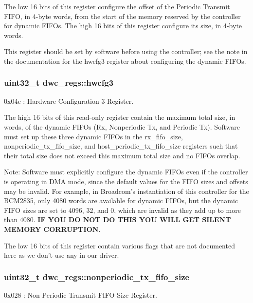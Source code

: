 The low 16 bits of this register configure the offset of the Periodic Transmit F\-I\-F\-O, in 4-\/byte words, from the start of the memory reserved by the controller for dynamic F\-I\-F\-Os. The high 16 bits of this register configure its size, in 4-\/byte words.

This register should be set by software before using the controller; see the note in the documentation for the hwcfg3 register about configuring the dynamic F\-I\-F\-Os. \hypertarget{structdwc__regs_a8c12bd03fc0263cffee12c1467519b7d}{
\subsubsection[{hwcfg3}]{\setlength{\rightskip}{0pt plus 5cm}uint32\-\_\-t dwc\-\_\-regs\-::hwcfg3}}\label{structdwc__regs_a8c12bd03fc0263cffee12c1467519b7d}
0x04c \-: Hardware Configuration 3 Register.

The high 16 bits of this read-\/only register contain the maximum total size, in words, of the dynamic F\-I\-F\-Os (Rx, Nonperiodic Tx, and Periodic Tx). Software must set up these three dynamic F\-I\-F\-Os in the rx\-\_\-fifo\-\_\-size, nonperiodic\-\_\-tx\-\_\-fifo\-\_\-size, and host\-\_\-periodic\-\_\-tx\-\_\-fifo\-\_\-size registers such that their total size does not exceed this maximum total size and no F\-I\-F\-Os overlap.

Note\-: Software must explicitly configure the dynamic F\-I\-F\-Os even if the controller is operating in D\-M\-A mode, since the default values for the F\-I\-F\-O sizes and offsets may be invalid. For example, in Broadcom's instantiation of this controller for the B\-C\-M2835, only 4080 words are available for dynamic F\-I\-F\-Os, but the dynamic F\-I\-F\-O sizes are set to 4096, 32, and 0, which are invalid as they add up to more than 4080. {\bfseries I\-F Y\-O\-U D\-O N\-O\-T D\-O T\-H\-I\-S Y\-O\-U W\-I\-L\-L G\-E\-T S\-I\-L\-E\-N\-T M\-E\-M\-O\-R\-Y C\-O\-R\-R\-U\-P\-T\-I\-O\-N}.

The low 16 bits of this register contain various flags that are not documented here as we don't use any in our driver. \hypertarget{structdwc__regs_a20bfce298b07fa70a9b94c8293f09a66}{
\subsubsection[{nonperiodic\-\_\-tx\-\_\-fifo\-\_\-size}]{\setlength{\rightskip}{0pt plus 5cm}uint32\-\_\-t dwc\-\_\-regs\-::nonperiodic\-\_\-tx\-\_\-fifo\-\_\-size}}\label{structdwc__regs_a20bfce298b07fa70a9b94c8293f09a66}
0x028 \-: Non Periodic Transmit F\-I\-F\-O Size Register.

